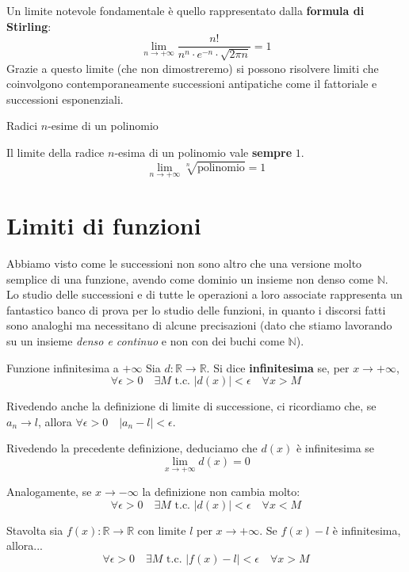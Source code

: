 \documentclass[12pt]{report}
\newcommand{\N}{\mathbb{N}}
\newcommand{\R}{\mathbb{R}}
\begin{document}
	Un limite notevole fondamentale è quello rappresentato dalla \textbf{formula di Stirling}:
	\[
		\lim_{n \to +\infty} \frac{n!}{n^n \cdot e^{-n} \cdot \sqrt{2 \pi n}} = 1
	\]
	Grazie a questo limite (che non dimostreremo) si possono risolvere limiti che coinvolgono contemporaneamente successioni antipatiche come il fattoriale e successioni esponenziali.
	
	\begin{teorema}{Radici $n$-esime di un polinomio}{}
		
		Il limite della radice $n$-esima di un polinomio vale \textbf{sempre} $1$.
		\[
			\lim_{n \to +\infty} \sqrt[n]{\text{polinomio}} = 1 
		\]
		
	\end{teorema}
	
	\chapter{Limiti di funzioni}
	
	Abbiamo visto come le successioni non sono altro che una versione molto semplice di una funzione, avendo come dominio un insieme non denso come $\N$.\\
	Lo studio delle successioni e di tutte le operazioni a loro associate rappresenta un fantastico banco di prova per lo studio delle funzioni, in quanto i discorsi fatti sono analoghi ma necessitano di alcune precisazioni (dato che stiamo lavorando su un insieme \textit{denso e continuo} e non con dei buchi come $\N$).
	
	\begin{definizione}{Funzione infinitesima a $+\infty$}{}
		Sia $d: \R \to \R$. Si dice \textbf{infinitesima} se, per $x \to +\infty$,
		\[
			\forall \epsilon > 0 \quad \exists M \text{ t.c. } |d(x)| < \epsilon \quad \forall x > M
		\]
	\end{definizione}
	
	Rivedendo anche la definizione di limite di successione, ci ricordiamo che, se $a_n \to l$, allora $\forall \epsilon > 0 \quad |a_n - l| < \epsilon$.
	
	Rivedendo la precedente definizione, deduciamo che $d(x)$ è infinitesima se 
	\[
		\lim_{x \to +\infty} d(x) = 0
	\]
	
	Analogamente, se $x \to -\infty$ la definizione non cambia molto:
	\[
		\forall \epsilon > 0 \quad \exists M \text{ t.c. } |d(x)| < \epsilon \quad \forall x < M
	\]
	
	Stavolta sia $f(x): \R \to \R$ con limite $l$ per $x \to +\infty$. Se $f(x) - l$ è infinitesima, allora...
	\[
		\forall \epsilon > 0 \quad \exists M \text{ t.c. } |f(x) - l| < \epsilon \quad \forall x > M
	\]
	
\end{document}
